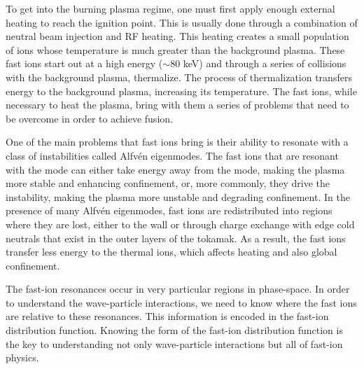 To get into the burning plasma regime, one must first apply enough external heating to reach the ignition point. This is usually done through a combination of neutral beam injection and RF heating. This heating creates a small population of ions whose temperature is much greater than the background plasma. These fast ions start out at a high energy ($\sim 80$ keV) and through a series of collisions with the background plasma, thermalize. The process of thermalization transfers energy to the background plasma, increasing its temperature. The fast ions, while necessary to heat the plasma, bring with them a series of problems that need to be overcome in order to achieve fusion.

One of the main problems that fast ions bring is their ability to resonate with a class of instabilities called Alfv\'en eigenmodes\cite{heidbrink2008basic}. The fast ions that are resonant with the mode can either take energy away from the mode, making the plasma more stable and enhancing confinement, or, more commonly, they drive the instability, making the plasma more unstable and degrading confinement. In the presence of many Alfv\'en eigenmodes, fast ions are redistributed into regions where they are lost, either to the wall or through charge exchange with edge cold neutrals that exist in the outer layers of the tokamak. As a result, the fast ions transfer less energy to the thermal ions, which affects heating and also global confinement.\cite{heidbrink2014confinement,holcomb2015fast}

The fast-ion resonances occur in very particular regions in phase-space. In order to understand the wave-particle interactions, we need to know where the fast ions are relative to these resonances. This information is encoded in the fast-ion distribution function. Knowing the form of the fast-ion distribution function is the key to understanding not only wave-particle interactions but all of fast-ion physics.

